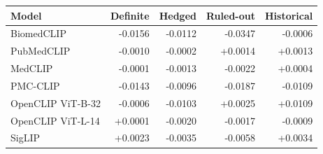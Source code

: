 \begin{tabular}{lrrrr}
\toprule
Model & Definite & Hedged & Ruled-out & Historical \\
\midrule
BiomedCLIP & -0.0156 & -0.0112 & -0.0347 & -0.0006 \\
PubMedCLIP & -0.0010 & -0.0002 & +0.0014 & +0.0013 \\
MedCLIP & -0.0001 & -0.0013 & -0.0022 & +0.0004 \\
PMC-CLIP & -0.0143 & -0.0096 & -0.0187 & -0.0109 \\
OpenCLIP ViT-B-32 & -0.0006 & -0.0103 & +0.0025 & +0.0109 \\
OpenCLIP ViT-L-14 & +0.0001 & -0.0020 & -0.0017 & -0.0009 \\
SigLIP & +0.0023 & -0.0035 & -0.0058 & +0.0034 \\
\bottomrule
\end{tabular}
